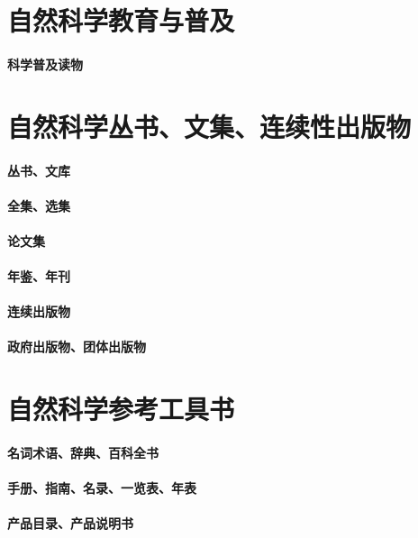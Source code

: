 \documentclass[UTF8]{NatureUniverse}
\begin{document}
\chapter{自然科学教育与普及}
    \subsubsection{科学普及读物}


\chapter{自然科学丛书、文集、连续性出版物}
    \subsubsection{丛书、文库}
    \subsubsection{全集、选集}
    \subsubsection{论文集}
    \subsubsection{年鉴、年刊}
    \subsubsection{连续出版物}
    \subsubsection{政府出版物、团体出版物}



\chapter{自然科学参考工具书}
    \subsubsection{名词术语、辞典、百科全书}
    \subsubsection{手册、指南、名录、一览表、年表}
    \subsubsection{产品目录、产品说明书}
\end{document}
